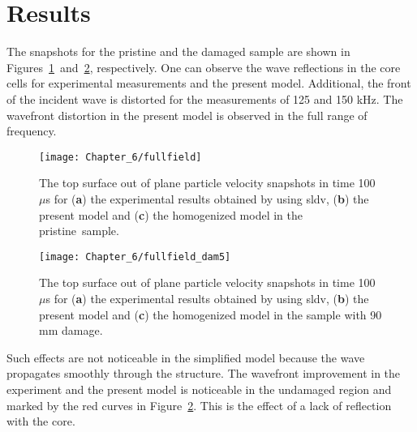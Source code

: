 \section{Results}
\label{sec:resuls}

The snapshots for the pristine and the damaged sample are shown in \mbox{Figures~\ref{fig:wavefield} and \ref{fig:wavefield_dam5}}, respectively.
One can observe the wave reflections in the core cells for experimental measurements and the present model. 
Additional, the front of the incident wave is distorted for the measurements of 125 and 150 kHz.
The wavefront distortion in the present model is observed in the full range of frequency. 

\vspace{-6pt}
\begin{figure}[H]
	\texttt{[image: Chapter\_6/fullfield]}
	\caption{The top surface out of plane particle velocity snapshots in time 100 \(\mu\)s for (\textbf{a}) the experimental results obtained by using \ac{sldv}, (\textbf{b}) the present model and (\textbf{c}) the homogenized model in the pristine~sample.}
	\label{fig:wavefield}
\end{figure}
\begin{figure}[H]
	\texttt{[image: Chapter\_6/fullfield\_dam5]}
	\caption{The top surface out of plane particle velocity snapshots in time 100~\(\mu\)s for (\textbf{a}) the experimental results obtained by using \ac{sldv}, (\textbf{b}) the present model and (\textbf{c}) the homogenized model in the sample with 90 mm damage.}
	\label{fig:wavefield_dam5}
\end{figure}

Such  effects are not noticeable in the simplified model because the wave propagates smoothly through the structure.
The wavefront improvement in the experiment and the present model is noticeable in the undamaged region and marked by the red curves in Figure~\ref{fig:wavefield_dam5}.
This is the effect of a lack of reflection with the core.